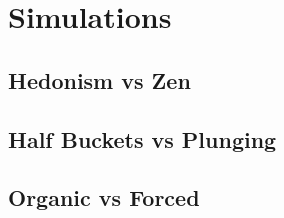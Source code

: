 \documentclass{article}
\begin{document}
\section{Simulations}

\subsection{Hedonism vs Zen}


\subsection{Half Buckets vs Plunging}


\subsection{Organic vs Forced}


\subsection{}
\end{document}
